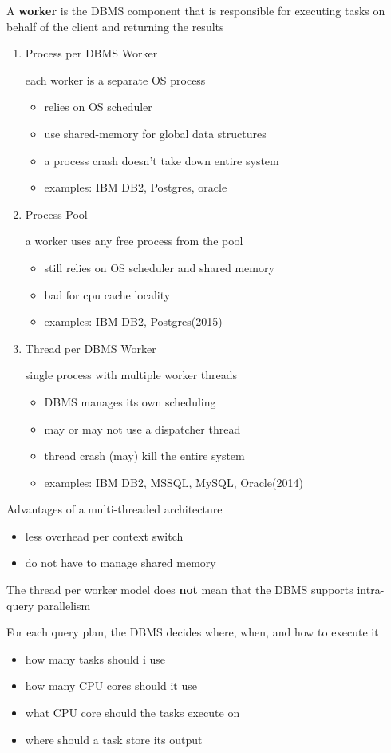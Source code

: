 \documentclass[11pt]{article}
\begin{document}
A \textbf{worker} is the DBMS component that is responsible for executing tasks on behalf of the client
and returning the results
\begin{enumerate}
\item Process per DBMS Worker

each worker is a separate OS process
\begin{itemize}
\item relies on OS scheduler
\item use shared-memory for global data structures
\item a process crash doesn't take down entire system
\item examples: IBM DB2, Postgres, oracle
\end{itemize}
\item Process Pool

a worker uses any free process from the pool
\begin{itemize}
\item still relies on OS scheduler and shared memory
\item bad for cpu cache locality
\item examples: IBM DB2, Postgres(2015)
\end{itemize}
\item Thread per DBMS Worker

single process with multiple worker threads
\begin{itemize}
\item DBMS manages its own scheduling
\item may or may not use a dispatcher thread
\item thread crash (may) kill the entire system
\item examples: IBM DB2, MSSQL, MySQL, Oracle(2014)
\end{itemize}
\end{enumerate}


Advantages of a multi-threaded architecture
\begin{itemize}
\item less overhead per context switch
\item do not have to manage shared memory
\end{itemize}

The thread per worker model does \textbf{not} mean that the DBMS supports intra-query parallelism

For each query plan, the DBMS decides where, when, and how to execute it
\begin{itemize}
\item how many tasks should i use
\item how many CPU cores should it use
\item what CPU core should the tasks execute on
\item where should a task store its output
\end{itemize}
\end{document}
